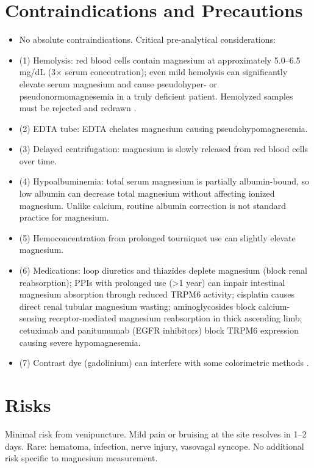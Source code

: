 \section*{Contraindications and Precautions}
\begin{itemize}
  \item No absolute contraindications. Critical pre-analytical considerations:
  \item (1) Hemolysis: red blood cells contain magnesium at approximately 5.0--6.5 mg/dL (3$\times$ serum concentration); even mild hemolysis can significantly elevate serum magnesium and cause pseudohyper- or pseudonormomagnesemia in a truly deficient patient. Hemolyzed samples must be rejected and redrawn \cite{workinger2018challenges}.
  \item (2) EDTA tube: EDTA chelates magnesium causing pseudohypomagnesemia.
  \item (3) Delayed centrifugation: magnesium is slowly released from red blood cells over time.
  \item (4) Hypoalbuminemia: total serum magnesium is partially albumin-bound, so low albumin can decrease total magnesium without affecting ionized magnesium. Unlike calcium, routine albumin correction is not standard practice for magnesium.
  \item (5) Hemoconcentration from prolonged tourniquet use can slightly elevate magnesium.
  \item (6) Medications: loop diuretics and thiazides deplete magnesium (block renal reabsorption); PPIs with prolonged use (>1 year) can impair intestinal magnesium absorption through reduced TRPM6 activity; cisplatin causes direct renal tubular magnesium wasting; aminoglycosides block calcium-sensing receptor-mediated magnesium reabsorption in thick ascending limb; cetuximab and panitumumab (EGFR inhibitors) block TRPM6 expression causing severe hypomagnesemia.
  \item (7) Contrast dye (gadolinium) can interfere with some colorimetric methods \cite{wallach2022interpretation}.
\end{itemize}
\section*{Risks}
Minimal risk from venipuncture. Mild pain or bruising at the site resolves in 1--2 days. Rare: hematoma, infection, nerve injury, vasovagal syncope. No additional risk specific to magnesium measurement.

